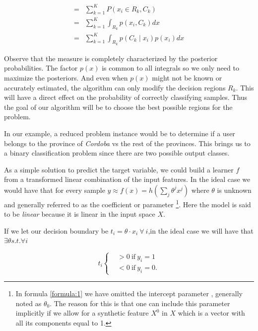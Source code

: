 \begin{equation}\label{eq:goodclassification-equation}
\begin{split}
= & \sum_{k=1}^{K} P(x_i \in R_k, C_k ) \\
= & \sum_{k=1}^{K} \int_{R_k}p(x_i,C_k) dx \\
= & \sum_{k=1}^{K} \int_{R_k}p(C_k \mid x_i) p(x_i) dx
\end{split}
\end{equation}

Observe that the measure is completely characterized by the posterior probabilities. The factor $p(x)$ is common to all integrals so we only need to maximize the posteriors. And even when $p(x)$ might not be known or accurately estimated, the algorithm can only modify the decision regions $R_k$. This will have a direct effect on the probability of correctly classifying samples. Thus the goal of our algorithm will be to choose the best possible regions for the problem.

In our example, a reduced problem instance would be to determine if a user belongs to the province of \textit{Cordoba} vs the rest of the provinces. This brings us to a binary classification problem since there are two possible output classes. %

As a simple solution to predict the target variable, we could build a learner $f$ from a transformed linear combination of the input features. In the ideal case we would have that for every sample $y \approx f(x) = h\left(\sum_{j}\theta^jx^j\right)$ \label{formula:1} where $\theta$ is unknown and generally referred to as the coefficient or parameter \footnote{In formula \cref{formula:1} we have omitted the intercept parameter , generally noted as $\theta_0$. The reason for this is that one can include this parameter implicitly if we allow for a synthetic feature $X^0$ in $X$ which is a vector with all its components equal to 1. }. Here the model is said to be \textit{linear} because it is linear in the input space $X$.

If we let our decision boundary be $ t_i = \theta \cdot x_i \ \forall \ i $,in the ideal case we will have that $\exists \theta s.t. \forall i $

\begin{equation}
t_i
\begin{cases}
&>0 \ \mbox{if} \ y_i=1 \\
&<0 \ \mbox{if} \ y_i=0.
\end{cases}
\end{equation}

